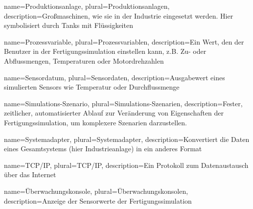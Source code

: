 {
  name=Produktionsanlage,
  plural=Produktionsanlagen,
  description={Großmaschinen, wie sie in der Industrie eingesetzt werden. Hier symbolisiert durch Tanks mit Flüssigkeiten}
}

{
  name=Prozessvariable,
  plural=Prozessvariablen,
  description={Ein Wert, den der Benutzer in der \gls{Fertigungssimulation} einstellen kann, z.B. Zu- oder Abflussmengen, Temperaturen oder Motordrehzahlen}
}

{
  name=Sensordatum,
  plural=Sensordaten,
  description={Ausgabewert eines simulierten Sensors wie Temperatur oder Durchflussmenge}
}

{
  name=Simulations-Szenario,
  plural=Simulations-Szenarien,
  description={Fester, zeitlicher, automatisierter Ablauf zur Veränderung von Eigenschaften der \gls{Fertigungssimulation}, um komplexere Szenarien darzustellen.}
}

{
  name=Systemadapter,
  plural=Systemadapter,
  description={Konvertiert die Daten eines Gesamtsystems (hier Industrieanlage) in ein anderes Format}
}

{
  name=TCP/IP,
  plural=TCP/IP,
  description={Ein Protokoll zum Datenaustausch über das Internet}
}

{
  name=Überwachungskonsole,
  plural=Überwachungskonsolen,
  description={Anzeige der Sensorwerte der Fertigungssimulation}
}
